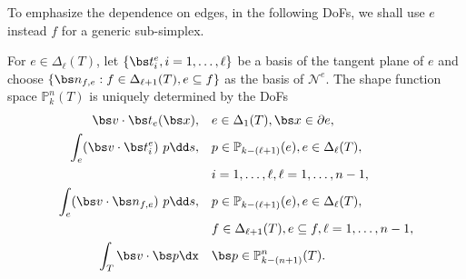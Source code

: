 To emphasize the dependence on edges, in the following DoFs, we shall use $e$ instead $f$ for a generic sub-simplex. 

\begin{lemma}\label{lm:localNedelec}
For $e\in \Delta_{\ell}(T)$, let $\{\bs t^e_i, i=1,\ldots, \ell\}$ be a basis of the tangent plane of $e$ and choose $\{\bs n_{f,e}: f\in \Delta_{\ell+1}(T), e\subseteq f\}$ as the basis of $\mathscr{N}^e$. 
The shape function space $\mathbb P_k^n(T)$ is uniquely determined by the DoFs
\begin{align}
\label{eq:vecbdDoF0}
\bs v\cdot \bs t_{e}({\bs x}), & \quad e\in \Delta_{1}(T), {\bs x}\in \partial e, \\
\label{eq:vecbdDoF1}
\int_e (\bs v\cdot \bs t_i^e)\ p \dd s, &\quad  p\in \mathbb P_{k - (\ell +1)} (e), e\in \Delta_{\ell}(T),\\
& \quad  i=1,\ldots, \ell, \ell = 1,\ldots, n-1, \notag\\
\label{eq:vecbdDoF2}
\int_e (\bs v\cdot \bs n_{f,e})\ p \dd s, &\quad  p\in \mathbb P_{k - (\ell +1)} (e),e\in \Delta_{\ell}(T), \\
& \quad f\in \Delta_{\ell+1}(T), e\subseteq f, \ell = 1,\ldots, n-1, \notag\\
\int_T \bs v \cdot \bs p \dx&\quad \bs p\in \mathbb P_{k-(n+1)}^n(T). \label{eq:bubbleDoF}
\end{align}
\end{lemma}
